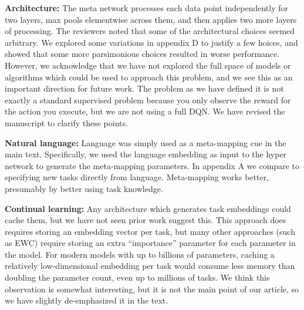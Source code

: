\documentclass{article}
\begin{document}
\textbf{Architecture:} The meta network processes each data point independently for two layers, max pools elementwise across them, and then applies two more layers of processing. The reviewers noted that some of the architectural choices seemed arbitrary. We explored some variations in appendix D to justify a few hoices, and showed that some more parsimonious choices resulted in worse performance. However, we acknowledge that we have not explored the full space of models or algorithms which could be used to approach this problem, and we see this as an important direction for future work. The problem as we have defined it is not exactly a standard supervised problem because you only observe the reward for the action you execute, but we are not using a full DQN. We have revised the manuscript to clarify these points. \par 
{}
\textbf{Natural language:} Language was simply used as a meta-mapping cue in the main text. Specifically, we used the language embedding as input to the hyper network to generate the meta-mapping parameters. In appendix A we compare to specifying new tasks directly from language. Meta-mapping works better, presumably by better using task knowledge. \par
{}
\textbf{Continual learning:} Any architecture which generates task embeddings could cache them, but we have not seen prior work suggest this. This approach does requires storing an embedding vector per task, but many other approaches (such as EWC) require storing an extra ``importance'' parameter for each parameter in the model. For modern models with up to billions of parameters, caching a relatively low-dimensional embedding per task would consume less memory than doubling the parameter count, even up to millions of tasks. We think this observation is somewhat interesting, but it is not the main point of our article, so we have slightly de-emphasized it in the text. \par
\end{document}
